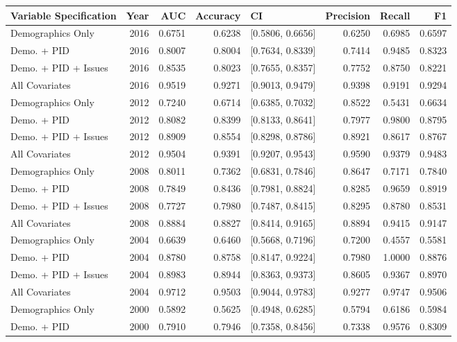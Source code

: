 \begin{longtable}{lrrrlrrr}
  \toprule
Variable Specification & Year & AUC & Accuracy & CI & Precision & Recall & F1 \\ 
  \midrule
Demographics Only & 2016 & 0.6751 & 0.6238 & [0.5806, 0.6656] & 0.6250 & 0.6985 & 0.6597 \\ 
  Demo. + PID & 2016 & 0.8007 & 0.8004 & [0.7634, 0.8339] & 0.7414 & 0.9485 & 0.8323 \\ 
  Demo. + PID + Issues & 2016 & 0.8535 & 0.8023 & [0.7655, 0.8357] & 0.7752 & 0.8750 & 0.8221 \\ 
  All Covariates & 2016 & 0.9519 & 0.9271 & [0.9013, 0.9479] & 0.9398 & 0.9191 & 0.9294 \\ 
  Demographics Only & 2012 & 0.7240 & 0.6714 & [0.6385, 0.7032] & 0.8522 & 0.5431 & 0.6634 \\ 
  Demo. + PID & 2012 & 0.8082 & 0.8399 & [0.8133, 0.8641] & 0.7977 & 0.9800 & 0.8795 \\ 
  Demo. + PID + Issues & 2012 & 0.8909 & 0.8554 & [0.8298, 0.8786] & 0.8921 & 0.8617 & 0.8767 \\ 
  All Covariates & 2012 & 0.9504 & 0.9391 & [0.9207, 0.9543] & 0.9590 & 0.9379 & 0.9483 \\ 
  Demographics Only & 2008 & 0.8011 & 0.7362 & [0.6831, 0.7846] & 0.8647 & 0.7171 & 0.7840 \\ 
  Demo. + PID & 2008 & 0.7849 & 0.8436 & [0.7981, 0.8824] & 0.8285 & 0.9659 & 0.8919 \\ 
  Demo. + PID + Issues & 2008 & 0.7727 & 0.7980 & [0.7487, 0.8415] & 0.8295 & 0.8780 & 0.8531 \\ 
  All Covariates & 2008 & 0.8884 & 0.8827 & [0.8414, 0.9165] & 0.8894 & 0.9415 & 0.9147 \\ 
  Demographics Only & 2004 & 0.6639 & 0.6460 & [0.5668, 0.7196] & 0.7200 & 0.4557 & 0.5581 \\ 
  Demo. + PID & 2004 & 0.8780 & 0.8758 & [0.8147, 0.9224] & 0.7980 & 1.0000 & 0.8876 \\ 
  Demo. + PID + Issues & 2004 & 0.8983 & 0.8944 & [0.8363, 0.9373] & 0.8605 & 0.9367 & 0.8970 \\ 
  All Covariates & 2004 & 0.9712 & 0.9503 & [0.9044, 0.9783] & 0.9277 & 0.9747 & 0.9506 \\ 
  Demographics Only & 2000 & 0.5892 & 0.5625 & [0.4948, 0.6285] & 0.5794 & 0.6186 & 0.5984 \\ 
  Demo. + PID & 2000 & 0.7910 & 0.7946 & [0.7358, 0.8456] & 0.7338 & 0.9576 & 0.8309 \\ 

\end{longtable}

